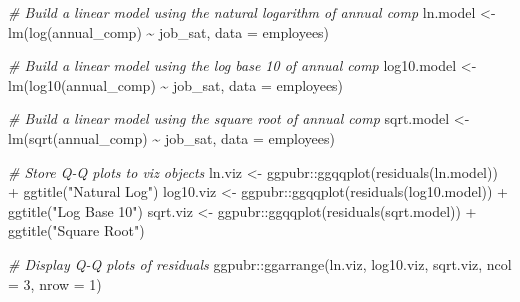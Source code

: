 \documentclass[
]{book}
\newenvironment{Shaded}{\begin{snugshade}}{\end{snugshade}}
\newcommand{\AttributeTok}[1]{\textcolor[rgb]{0.77,0.63,0.00}{#1}}
\newcommand{\CommentTok}[1]{\textcolor[rgb]{0.56,0.35,0.01}{\textit{#1}}}
\newcommand{\DecValTok}[1]{\textcolor[rgb]{0.00,0.00,0.81}{#1}}
\newcommand{\FunctionTok}[1]{\textcolor[rgb]{0.00,0.00,0.00}{#1}}
\newcommand{\NormalTok}[1]{#1}
\newcommand{\OtherTok}[1]{\textcolor[rgb]{0.56,0.35,0.01}{#1}}
\newcommand{\SpecialCharTok}[1]{\textcolor[rgb]{0.00,0.00,0.00}{#1}}
\newcommand{\StringTok}[1]{\textcolor[rgb]{0.31,0.60,0.02}{#1}}
\begin{document}
\begin{Shaded}
\begin{Highlighting}[]
\CommentTok{\# Build a linear model using the natural logarithm of annual comp}
\NormalTok{ln.model }\OtherTok{\textless{}{-}} \FunctionTok{lm}\NormalTok{(}\FunctionTok{log}\NormalTok{(annual\_comp) }\SpecialCharTok{\textasciitilde{}}\NormalTok{ job\_sat, }\AttributeTok{data =}\NormalTok{ employees)}

\CommentTok{\# Build a linear model using the log base 10 of annual comp}
\NormalTok{log10.model }\OtherTok{\textless{}{-}} \FunctionTok{lm}\NormalTok{(}\FunctionTok{log10}\NormalTok{(annual\_comp) }\SpecialCharTok{\textasciitilde{}}\NormalTok{ job\_sat, }\AttributeTok{data =}\NormalTok{ employees)}

\CommentTok{\# Build a linear model using the square root of annual comp}
\NormalTok{sqrt.model }\OtherTok{\textless{}{-}} \FunctionTok{lm}\NormalTok{(}\FunctionTok{sqrt}\NormalTok{(annual\_comp) }\SpecialCharTok{\textasciitilde{}}\NormalTok{ job\_sat, }\AttributeTok{data =}\NormalTok{ employees)}

\CommentTok{\# Store Q{-}Q plots to viz objects}
\NormalTok{ln.viz }\OtherTok{\textless{}{-}}\NormalTok{ ggpubr}\SpecialCharTok{::}\FunctionTok{ggqqplot}\NormalTok{(}\FunctionTok{residuals}\NormalTok{(ln.model)) }\SpecialCharTok{+} \FunctionTok{ggtitle}\NormalTok{(}\StringTok{"Natural Log"}\NormalTok{)}
\NormalTok{log10.viz }\OtherTok{\textless{}{-}}\NormalTok{ ggpubr}\SpecialCharTok{::}\FunctionTok{ggqqplot}\NormalTok{(}\FunctionTok{residuals}\NormalTok{(log10.model)) }\SpecialCharTok{+} \FunctionTok{ggtitle}\NormalTok{(}\StringTok{"Log Base 10"}\NormalTok{)}
\NormalTok{sqrt.viz }\OtherTok{\textless{}{-}}\NormalTok{ ggpubr}\SpecialCharTok{::}\FunctionTok{ggqqplot}\NormalTok{(}\FunctionTok{residuals}\NormalTok{(sqrt.model)) }\SpecialCharTok{+} \FunctionTok{ggtitle}\NormalTok{(}\StringTok{"Square Root"}\NormalTok{)}

\CommentTok{\# Display Q{-}Q plots of residuals}
\NormalTok{ggpubr}\SpecialCharTok{::}\FunctionTok{ggarrange}\NormalTok{(ln.viz, log10.viz, sqrt.viz,}
          \AttributeTok{ncol =} \DecValTok{3}\NormalTok{, }\AttributeTok{nrow =} \DecValTok{1}\NormalTok{)}
\end{Highlighting}
\end{Shaded}
\end{document}
